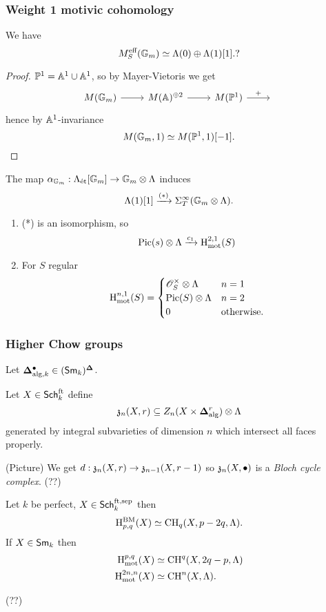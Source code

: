 \subsubsection{Weight 1 motivic cohomology}
\begin{lemma}
	We have
	\[
		M_S^{\text{eff}}(\mathbb{G}_m) \simeq \Lambda(0) \oplus \Lambda(1)[1].?
	\] 
\end{lemma}
\begin{proof}
	$\mathbb{P}^{1}=\mathbb A^{1}\cup \mathbb A^{1}$, so by Mayer-Vietoris we get
	\[
	\begin{tikzcd}
		M(\Gm) \ar[r] & M(\Aff)^{\oplus 2} \ar[r] & M(\P^{1}) \ar[r,"+"] & {}
	\end{tikzcd}
	\] 
	hence by $\mathbb A^{1}$-invariance
	\[
		M(\mathbb{G}_m,1) \simeq M(\mathbb{P}^{1},1)[-1].
	\] 
\end{proof}
The map $\alpha_{\Gm}:\Lambda_{\text{\'et}}[\Gm]\to \Gm\otimes \Lambda$ induces
\[
	\Lambda(1)[1] \xrightarrow{(*)} \Sigma_{T}^{\infty} (\mathbb{G}_m\otimes\Lambda).
\] 
\begin{theorem}\leavevmode
	\begin{enumerate}[1)]
		\item (*) is an isomorphism, so
			\[
				\operatorname{Pic}(s)\otimes \Lambda \xrightarrow{c_1} \mathrm{H}_{\text{mot}}^{2,1}(S)
			\] 
		\item For $S$ regular
			\[
			\mathrm{H}_{\text{mot}}^{n,1}(S) = \begin{cases}
				\mathscr{O}_S^{\times }\otimes\Lambda & n=1 \\
				\operatorname{Pic}(S)\otimes\Lambda & n=2 \\
				0 & \text{otherwise}.
			\end{cases}
			\] 
	\end{enumerate}
\end{theorem}
\subsubsection{Higher Chow groups}
Let $\mathbf{\Delta}_{\text{alg},k}^{\bullet}\in (\mathsf{Sm}_k)^{\mathbf{\Delta}}$.
\begin{definition}
	Let $X\in \mathsf{Sch}_k^{\text{ft}}$ define
	\[
	\mathfrak{z}_n(X,r) \subseteq Z_n(X\times \mathbf{\Delta}_{\text{alg}}^{r})\otimes\Lambda
	\] 
	generated by integral subvarieties of dimension $n$ which intersect all faces properly.
\end{definition}
(Picture) We get $d:\kz_n(X,r)\to \kz_{n-1}(X,r-1)$ so $\mathfrak{z}_n(X,\bullet)$ is a \emph{Bloch cycle complex}.
(??)

\begin{theorem}
	Let $k$ be perfect, $X\in \mathsf{Sch}_k^{\text{ft,sep}}$ then
	\[
	\mathrm{H}_{p,q}^{\text{BM}}(X)\simeq \operatorname{CH}_q(X,p-2q,\Lambda).
	\] 
	If $X\in \mathsf{Sm}_k$ then
	\begin{align*}
		\mathrm{H}^{p,q}_{\text{mot}}(X) &\simeq \operatorname{CH}^{q}(X,2q-p,\Lambda) \\
		\mathrm{H}_{\text{mot}}^{2n,n}(X) &\simeq \operatorname{CH}^{n}(X,\Lambda).
	\end{align*}
\end{theorem}
(??)

